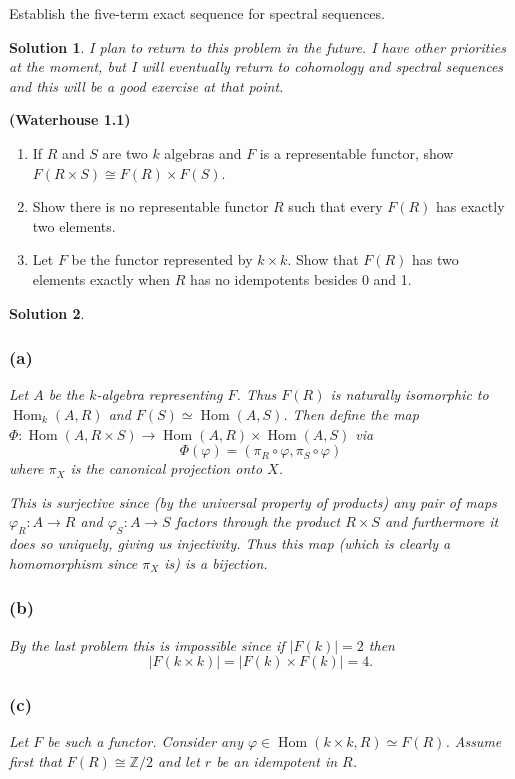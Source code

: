 \documentclass[12pt]{article}
\theoremstyle{nonumberbreak}
\newtheorem{sol}{Solution}
\theoremstyle{changebreak}
\theoremstyle{nonumberplain}
\theoremstyle{change}
\newenvironment{wprob}[1]{\begin{prob}{\normalfont\bfseries (Waterhouse #1) }\itshape}{\end{prob}}
\newcommand*{\Z}{
\mathbb{Z}
}
\DeclareMathOperator{\Hom}{Hom}
\begin{document}
\begin{prob}
	Establish the five-term exact sequence for spectral sequences.
\end{prob}
\begin{sol}
	I plan to return to this problem in the future. I have other priorities at the moment,
	but I will eventually return to cohomology and spectral sequences and this will be a good
	exercise at that point.
\end{sol}

\begin{wprob}{1.1}
	\begin{enumerate}
		\item If $R$ and $S$ are two $k$ algebras and $F$ is a representable functor, show $F(R\times S)\cong F(R)\times F(S)$.
		\item Show there is no representable functor $R$ such that every $F(R)$ has exactly two elements.
		\item Let $F$ be the functor represented by $k\times k$. Show that $F(R)$ has two elements exactly when $R$ has no idempotents besides 0 and 1.
	\end{enumerate}
\end{wprob}

\begin{sol}
	\subsubsection*{(a)}
	Let $A$ be the $k$-algebra representing $F$. Thus $F(R)$ is naturally isomorphic to
	$\Hom_k(A,R)$ and $F(S)\simeq\Hom(A,S)$. Then define the map $\Phi:\Hom(A,R\times S)\to\Hom(A,R)\times\Hom(A,S)$
	via
	\[\Phi(\varphi)=(\pi_R\circ\varphi,\pi_S\circ\varphi)\]
	where $\pi_X$ is the canonical projection onto $X$.

	This is surjective since (by the universal property of products) any pair of maps
	$\varphi_R:A\to R$ and $\varphi_S:A\to S$ factors through the product $R\times S$
	and furthermore it does so \textit{uniquely}, giving us injectivity. Thus this map
	(which is clearly a homomorphism since $\pi_X$ is) is a bijection.
	\subsubsection*{(b)}
	By the last problem this is impossible since if $|F(k)|=2$ then 
	\[|F(k\times k)|=|F(k)\times F(k)|=4.\]
	\subsubsection*{(c)}
	Let $F$ be such a functor. Consider any $\varphi\in\Hom(k\times k, R)\simeq F(R)$.
	Assume first that $F(R)\cong \Z/2$ and let $r$ be an idempotent in $R$. 
\end{sol}
\end{document}
